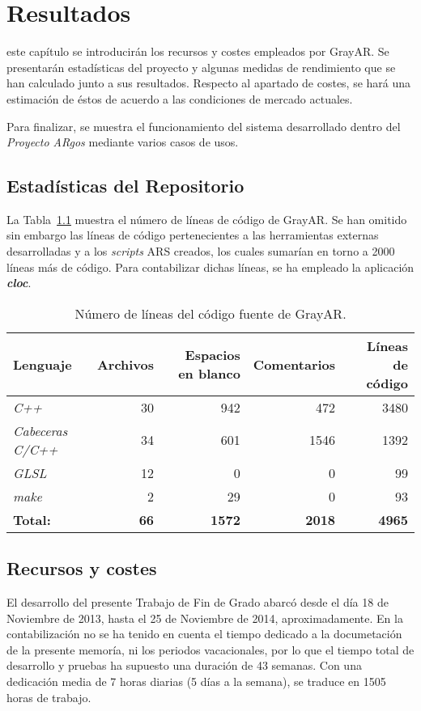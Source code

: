\chapter{Resultados}
\label{chap:resultados}

 este capítulo se introducirán los recursos y costes empleados por GrayAR. Se presentarán estadísticas del proyecto y algunas medidas de rendimiento que se han calculado junto a sus
resultados. Respecto al apartado de costes, se hará una estimación de éstos de acuerdo a las condiciones de mercado actuales.

Para finalizar, se muestra el funcionamiento del sistema desarrollado dentro del \textit{Proyecto ARgos} mediante varios casos de usos.  

\section{Estadísticas del Repositorio}

La Tabla~\ref{tab:number_of_lines} muestra el número de líneas de código de GrayAR. Se han omitido
sin embargo las líneas de código pertenecientes a las herramientas externas desarrolladas y a los
\textit{scripts} ARS creados, los cuales sumarían en torno a 2000 líneas más de código. Para
contabilizar dichas líneas, se ha empleado la aplicación \textbf{\textit{cloc}}.

\begin{table}[h]
  \centering
  \begin{tabular}{|l|r|r|r|r|}
    \hline
    \textbf{Lenguaje} & \textbf{Archivos} & \textbf{Espacios en blanco} & \textbf{Comentarios} & \textbf{Líneas de código} \\
    \hline
    \textit{C++} & 30 & 942 & 472 & 3480 \\
    \hline
    \textit{Cabeceras C/C++} & 34 & 601 & 1546 & 1392 \\
    \hline
    \textit{GLSL} & 12 & 0 & 0 & 99 \\
    \hline
    \textit{make} & 2 & 29 & 0 & 93 \\
    \hline
    \textbf{Total:} & \textbf{66} & \textbf{1572} & \textbf{2018} & \textbf{4965} \\
    \hline
  \end{tabular}
  \caption{Número de líneas del código fuente de GrayAR.}
  \label{tab:number_of_lines}
\end{table}

\section{Recursos y costes}
El desarrollo del presente Trabajo de Fin de Grado abarcó desde el día 18 de Noviembre de 2013, hasta
el 25 de Noviembre de 2014, aproximadamente. En la contabilización no se ha tenido en cuenta el tiempo dedicado a la documetación de la presente memoría, ni los periodos vacacionales, por lo que el tiempo total de desarrollo y pruebas ha supuesto una duración de 43 semanas. Con una dedicación media de 7 horas diarias (5 días a la semana), se traduce en 1505 horas de trabajo. 

